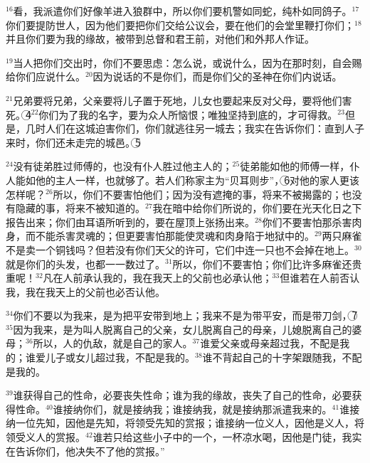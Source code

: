 $^{16}$看，我派遣你们好像羊进入狼群中，所以你们要机警如同蛇，纯朴如同鸽子。$^{17}$你们要提防世人，因为他们要把你们交给公议会，要在他们的会堂里鞭打你们；$^{18}$并且你们要为我的缘故，被带到总督和君王前，对他们和外邦人作证。


$^{19}$当人把你们交出时，你们不要思虑：怎么说，或说什么，因为在那时刻，自会赐给你们应说什么。$^{20}$因为说话的不是你们，而是你们父的圣神在你们内说话。


$^{21}$兄弟要将兄弟，父亲要将儿子置于死地，儿女也要起来反对父母，要将他们害死。\textcircled{4}$^{22}$你们为了我的名字，要为众人所恼恨；唯独坚持到底的，才可得救。$^{23}$但是，几时人们在这城迫害你们，你们就逃往另一城去；我实在告诉你们：直到人子来时，你们还未走完\UL[以色列]的城邑。\textcircled{5}


$^{24}$没有徒弟胜过师傅的，也没有仆人胜过他主人的；$^{25}$徒弟能如他的师傅一样，仆人能如他的主人一样，也就够了。若人们称家主为“贝耳则步”，\textcircled{6}对他的家人更该怎样呢？$^{26}$所以，你们不要害怕他们；因为没有遮掩的事，将来不被揭露的；也没有隐藏的事，将来不被知道的。$^{27}$我在暗中给你们所说的，你们要在光天化日之下报告出来；你们由耳语所听到的，要在屋顶上张扬出来。$^{28}$你们不要害怕那杀害肉身，而不能杀害灵魂的；但更要害怕那能使灵魂和肉身陷于地狱中的。$^{29}$两只麻雀不是卖一个铜钱吗？但若没有你们天父的许可，它们中连一只也不会掉在地上。$^{30}$就是你们的头发，也都一一数过了。$^{31}$所以，你们不要害怕；你们比许多麻雀还贵重呢！$^{32}$凡在人前承认我的，我在我天上的父前也必承认他；$^{33}$但谁若在人前否认我，我在我天上的父前也必否认他。


$^{34}$你们不要以为我来，是为把平安带到地上；我来不是为带平安，而是带刀剑，\textcircled{7}$^{35}$因为我来，是为叫人脱离自己的父亲，女儿脱离自己的母亲，儿媳脱离自己的婆母；$^{36}$所以，人的仇敌，就是自己的家人。$^{37}$谁爱父亲或母亲超过我，不配是我的；谁爱儿子或女儿超过我，不配是我的。$^{38}$谁不背起自己的十字架跟随我，不配是我的。


$^{39}$谁获得自己的性命，必要丧失性命；谁为我的缘故，丧失了自己的性命，必要获得性命。$^{40}$谁接纳你们，就是接纳我；谁接纳我，就是接纳那派遣我来的。$^{41}$谁接纳一位先知，因他是先知，将领受先知的赏报；谁接纳一位义人，因他是义人，将领受义人的赏报。$^{42}$谁若只给这些小子中的一个，一杯凉水喝，因他是门徒，我实在告诉你们，他决失不了他的赏报。”


